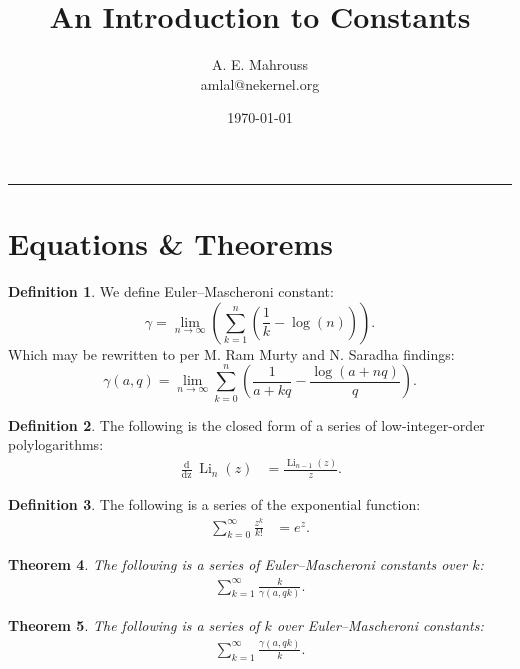 \documentclass[10pt]{article}
\title{%
	\vspace{-1.5em}%
	\large\textbf{An Introduction to Constants}%
}
\author{A. E. Mahrouss\\amlal@nekernel.org}
\date{\today}
\theoremstyle{plain}
\newtheorem{theorem}{Theorem}[section]
\theoremstyle{definition}
\newtheorem{definition}[theorem]{Definition}
\theoremstyle{remark}
\begin{document}
	
		\maketitle
\vspace{-0.5em}
\vspace{0.8em}
\rule{\linewidth}{0.4pt}
\vspace{1em}
	
	
	\section{Equations \& Theorems}
	
	\begin{definition}
		We define Euler–Mascheroni constant:
		\begin{equation}
			\gamma = \lim_{n \to \infty}(\sum_{k=1}^{n}(\frac{1}{k}-\log(n))).
		\end{equation}
		Which may be rewritten to per M. Ram Murty and N. Saradha findings:
		\begin{equation}
			\gamma(a, q) = \lim_{n \to \infty}\sum_{k=0}^{n}(\frac{1}{a+kq}-\frac{\log(a+nq)}{q}).
		\end{equation}
	\end{definition}
	
	\begin{definition}
		The following is the closed form of a series of low-integer-order polylogarithms:
		\begin{align*}
			\frac{\operatorname{d}}{\operatorname{dz}} \operatorname{Li}_{n}(z) &= \frac{\operatorname{Li}_{n-1}(z)}{z}.
		\end{align*}
	\end{definition}
	
	\begin{definition}
		The following is a series of the exponential function:
		\begin{align*}
			\sum_{k=0}^{\infty} \frac{z^k}{k!} &= e^{z}.
		\end{align*}
	\end{definition}
	
	\begin{theorem}
		The following is a series of Euler–Mascheroni constants over $k$:
		\begin{align*}
			\sum_{k=1}^{\infty} \frac{k}{\gamma(a, qk)}.
		\end{align*}
	\end{theorem}
	
	\begin{theorem}
		The following is a series of $k$ over Euler–Mascheroni constants:
		\begin{align*}
			\sum_{k=1}^{\infty} \frac{\gamma(a, qk)}{k}.
		\end{align*}
	\end{theorem}
	
\end{document}
